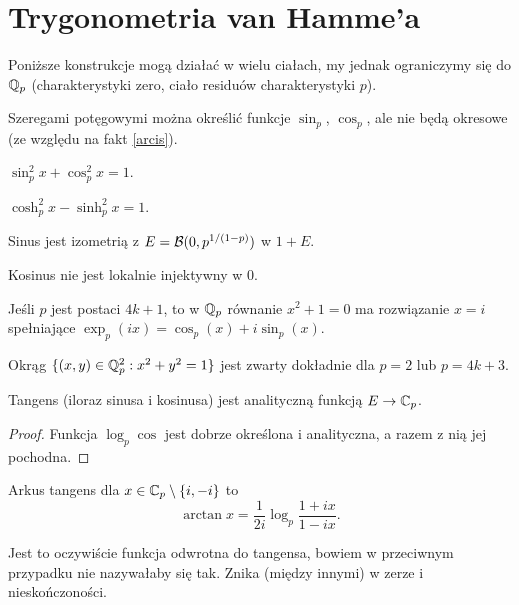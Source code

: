 \section{Trygonometria van Hamme'a}
Poniższe konstrukcje mogą działać w wielu ciałach, my jednak ograniczymy się do $\mathbb Q_p$ (charakterystyki zero, ciało residuów charakterystyki $p$).

Szeregami potęgowymi można określić funkcje $\sin_p$, $\cos_p$, ale nie będą okresowe (ze względu na fakt \ref{arcis}).

\begin{fakt}
	$\sin_p^2x + \cos_p^2x = 1$.
\end{fakt}

\begin{fakt}
	$\cosh_p^2x - \sinh_p^2x = 1$.
\end{fakt}

\begin{fakt}
	Sinus jest izometrią z $E = \mathcal B(0, p^{1/(1-p)})$ w $1 + E$.
\end{fakt}

\begin{fakt}
	Kosinus nie jest lokalnie injektywny w $0$.
\end{fakt}

\begin{fakt}
	Jeśli $p$ jest postaci $4k + 1$, to w $\mathbb Q_p$ równanie $x^2 + 1 = 0$ ma rozwiązanie $x = i$ spełniające $\exp_p(ix) = \cos_p(x) + i \sin_p(x)$.
\end{fakt}

\begin{wniosek}
	Okrąg $\{(x,y) \in \mathbb Q_p^2 : x^2 + y^2 = 1\}$ jest zwarty dokładnie dla $p = 2$ lub $p = 4k+3$.
\end{wniosek}

\begin{fakt}
	Tangens (iloraz sinusa i kosinusa) jest analityczną funkcją $E \to \mathbb C_p$.
\end{fakt}

\begin{proof}
	Funkcja $\log_p \cos$ jest dobrze określona i analityczna, a razem z nią jej pochodna.
\end{proof}

\begin{definicja}
	Arkus tangens dla $x \in \mathbb C_p \setminus \{i, -i\}$ to
	\[
		\arctan x = \frac 1{2i} \log_p \frac{1 + ix}{1 - ix}.
	\]
\end{definicja}

Jest to oczywiście funkcja odwrotna do tangensa, bowiem w przeciwnym przypadku nie nazywałaby się tak.
Znika (między innymi) w zerze i nieskończoności.

